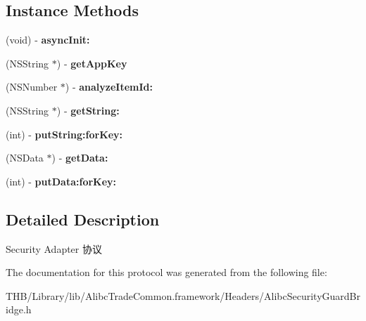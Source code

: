 \subsection*{Instance Methods}
\begin{DoxyCompactItemize}
\item 
\mbox{\label{protocol_alibc_security_adapter_01-p_a538551f5afbf00018115f7984c006b67}} 
(void) -\/ {\bfseries async\+Init\+:}
\item 
\mbox{\label{protocol_alibc_security_adapter_01-p_aa7dcac69f0c7ac3f03960221afff5d8a}} 
(N\+S\+String $\ast$) -\/ {\bfseries get\+App\+Key}
\item 
\mbox{\label{protocol_alibc_security_adapter_01-p_ae2d45286eca30cb64e2d9d69b98175c0}} 
(N\+S\+Number $\ast$) -\/ {\bfseries analyze\+Item\+Id\+:}
\item 
\mbox{\label{protocol_alibc_security_adapter_01-p_a49d8b75a74fa489ab711a155669bef9c}} 
(N\+S\+String $\ast$) -\/ {\bfseries get\+String\+:}
\item 
\mbox{\label{protocol_alibc_security_adapter_01-p_a034669d767f961b9b081f6822bb92041}} 
(int) -\/ {\bfseries put\+String\+:for\+Key\+:}
\item 
\mbox{\label{protocol_alibc_security_adapter_01-p_ae2842587b701595d86360d3d5c160776}} 
(N\+S\+Data $\ast$) -\/ {\bfseries get\+Data\+:}
\item 
\mbox{\label{protocol_alibc_security_adapter_01-p_a54c1b03ad2ba2628fd8d965182885277}} 
(int) -\/ {\bfseries put\+Data\+:for\+Key\+:}
\end{DoxyCompactItemize}


\subsection{Detailed Description}
Security Adapter 协议 

The documentation for this protocol was generated from the following file\+:\begin{DoxyCompactItemize}
\item 
T\+H\+B/\+Library/lib/\+Alibc\+Trade\+Common.\+framework/\+Headers/Alibc\+Security\+Guard\+Bridge.\+h\end{DoxyCompactItemize}
